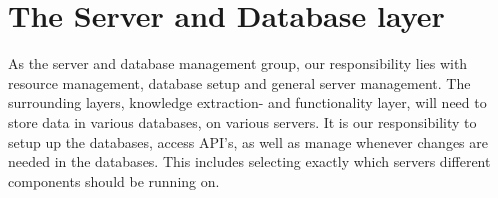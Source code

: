 \section{The Server and Database layer}

As the server and database management group, our responsibility lies with resource management, database setup and general server management. The surrounding layers, knowledge extraction- and functionality layer, will need to store data in various databases, on various servers. It is our responsibility to setup up the databases, access API's, as well as manage whenever changes are needed in the databases. This includes selecting exactly which servers different components should be running on.

